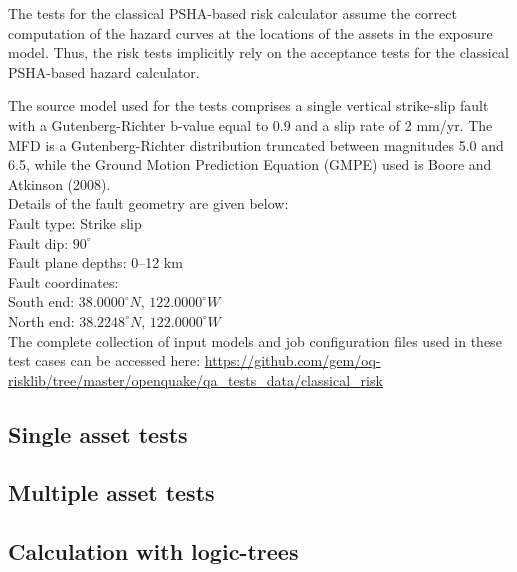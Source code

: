 The tests for the classical PSHA-based risk calculator assume the correct computation of the hazard curves at the locations of the assets in the exposure model. Thus, the risk tests implicitly rely on the acceptance tests for the classical PSHA-based hazard calculator.

The source model used for the tests comprises a single vertical strike-slip fault with a Gutenberg-Richter b-value equal to 0.9 and a slip rate of 2 mm/yr. The MFD is a Gutenberg-Richter distribution truncated between magnitudes 5.0 and 6.5, while the Ground Motion Prediction Equation (GMPE) used is Boore and Atkinson (2008).\\

\noindent Details of the fault geometry are given below:\\

\noindent
Fault type: Strike slip\\
Fault dip: $90^{\circ}$\\
Fault plane depths: 0--12 km\\
Fault coordinates:\\
South end: $38.0000^{\circ} N$, $122.0000^{\circ} W$\\
North end: $38.2248^{\circ} N$, $122.0000^{\circ} W$\\

The complete collection of input models and job configuration files used in these test cases can be accessed here:
\href{https://github.com/gem/oq-risklib/tree/master/openquake/qa_tests_data/classical_risk}
{https://github.com/gem/oq-risklib/tree/master/openquake/qa\_tests\_data/classical\_risk}

\subsection{Single asset tests}
\label{subsec:acc-cr-single}


\subsection{Multiple asset tests}
\label{subsec:acc-cr-multiple}


% 

\subsection{Calculation with logic-trees}
\label{subsec:acc-cr-lt}


